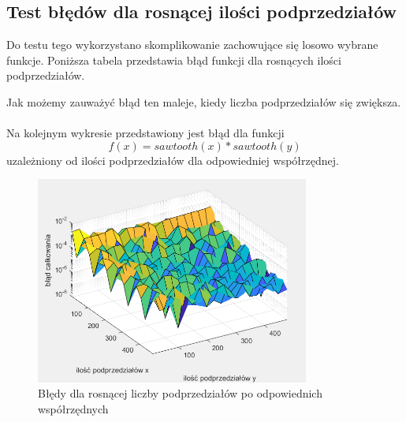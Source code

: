 \documentclass[12pt]{article}
\begin{document}
\subsection{Test b\l ęd\'ow dla rosnącej ilo\'sci podprzedzia\l \'ow}
Do testu tego wykorzystano skomplikowanie zachowujące się losowo wybrane funkcje.
Poni\.zsza tabela przedstawia b\l ąd funkcji dla rosnących ilo\'sci podprzedzia\l \'ow.
\begin{center}
\end{center}
Jak mo\.zemy zauwa\.zy\'c b\l ąd ten maleje, kiedy liczba podprzedzia\l \'ow się zwiększa.\\ \\
Na kolejnym wykresie przedstawiony jest b\l ąd dla funkcji \[f(x) = sawtooth(x) * sawtooth(y)\] uzale\.zniony od ilo\'sci 
podprzedzia\l \'ow dla odpowiedniej wsp\'o\l rzędnej.  \\
\begin{figure}[h]
    \centering
    \includegraphics[width=9cm]{3D_3d.png}
    \caption{B\l ędy dla rosnącej liczby podprzedzia\l \'ow po odpowiednich wsp\'o\l rzędnych}
\end{figure}
\end{document}
